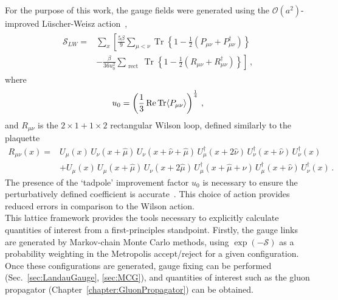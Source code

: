 For the purpose of this work, the gauge fields were generated using the $\mathcal{O}(a^2)$-improved L\"uscher-Weisz action~\cite{Luscher:1984xn}, 
%
\begin{align}
\begin{aligned} \mathcal{S} _ { LW } = &\sum_x \left[ \frac { 5 \beta } { 9 } \sum _ { \mu < \nu } \operatorname { Tr } \left\{ 1 - \frac { 1 } { 2 } \left( P _ { \mu \nu } + P _ { \mu \nu } ^ { \dagger } \right) \right\}\right. \\
& \left.- \frac { \beta } { 36 u _ { 0 } ^ { 2 } } \sum _ { \text { rect } } \operatorname { Tr } \left\{ 1 - \frac { 1 } { 2 } \left( R _ { \mu \nu } + R _ { \mu \nu } ^ { \dagger } \right) \right\}\right]\, , \end{aligned}
\end{align}
%
where
\begin{equation}
u_0 = \left(\frac{1}{3}\operatorname{ Re } \operatorname{Tr}\langle P_{\mu\nu} \rangle\right)^{\frac{1}{4}}\, ,
\end{equation}
and $R_{\mu\nu}$ is the $2\times 1 + 1\times 2$ rectangular Wilson loop, defined similarly to the plaquette 
\begin{align}
 R _ { \mu \nu } ( x ) =  &  U_\mu( x )\, U_\nu( x + \hat { \mu } )\, U_\nu( x + \hat { \nu } + \hat { \mu } )\, U_\mu^\dagger ( x + 2 \hat { \nu } )\, U _\nu^\dagger( x + \hat { \nu } )\, U_\nu^\dagger( x )\nonumber\\
&+ U_\mu ( x )\, U_\mu ( x + \hat{\mu} )\, U_\nu( x + 2 \hat { \mu } )\, U_\mu^\dagger ( x + \hat { \mu } + \hat { \nu } )\, U_\mu^\dagger ( x + \hat { \nu } )\, U_\nu^\dagger( x ) \, .
\end{align}
The presence of the `tadpole' improvement factor $u_0$ is necessary to ensure the perturbatively defined coefficient is accurate~\cite{Lepage:1992xa}. This choice of action provides reduced errors in comparison to the Wilson action.\\

This lattice framework provides the tools necessary to explicitly calculate quantities of interest from a first-principles standpoint. Firstly, the gauge links are generated by Markov-chain Monte Carlo methods, using $\exp\left(-\mathcal{S}\right)$ as a probability weighting in the Metropolis accept/reject for a given configuration. Once these configurations are generated, gauge fixing can be performed (Sec.~\ref{sec:LandauGauge}, \ref{sec:MCG}), and quantities of interest such as the gluon propagator (Chapter~\ref{chapter:GluonPropagator}) can be obtained.

